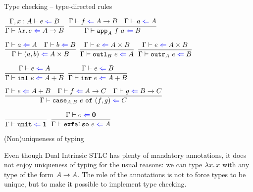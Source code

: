 \documentclass{beamer}
\begin{document}
\begin{frame}{Type checking -- type-directed rules}

\begin{center}
  $\infrule{\fullcheck{\extend{\Gamma}{x}{A}}{e}{B}}{\check{\fun{x}{e}}{\Fun{A}{B}}}$ \enspace
  $\infrule{\check{f}{\Fun{A}{B}} \quad \check{a}{A}}{\check{\iapp{A}{f}{a}}{B}}$

  \vspace{2em}

  $\infrule{\check{a}{A} \quad \check{b}{B}}{\check{\pair{a}{b}}{\Prod{A}{B}}}$ \enspace
  $\infrule{\check{e}{\Prod{A}{B}}}{\check{\ioutl{B}{e}}{A}}$ \enspace
  $\infrule{\check{e}{\Prod{A}{B}}}{\check{\ioutr{A}{e}}{B}}$

  \vspace{2em}

  $\infrule{\check{e}{A}}{\check{\inl{e}}{\Sum{A}{B}}}$ \quad
  $\infrule{\check{e}{B}}{\check{\inr{e}}{\Sum{A}{B}}}$

  \vspace{2em}

  $\infrule{\check{e}{\Sum{A}{B}} \quad \check{f}{\Fun{A}{C}} \quad \check{g}{\Fun{B}{C}}}{\check{\icase{A}{B}{e}{f}{g}}{C}}$

  \vspace{2em}

  $\infrule{}{\check{\unit}{\Unit}}$ \quad
  $\infrule{\check{e}{\Empty}}{\check{\exfalso{e}}{A}}$
\end{center}

\end{frame}

\begin{frame}{(Non)uniqueness of typing}

Even though Dual Intrinsic STLC has plenty of mandatory annotations, it does not enjoy uniqueness of typing for the usual reasons: we can type $\lambda x.\, x$ with any type of the form $A \to A$. The role of the annotations is not to force types to be unique, but to make it possible to implement type checking.

\end{frame}
\end{document}
